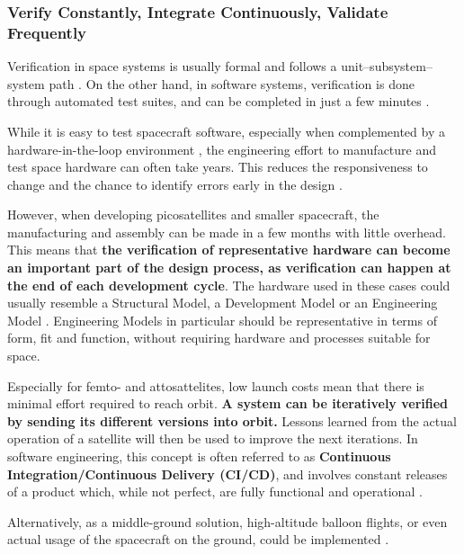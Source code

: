 \documentclass[]{iac}
\begin{document}

\subsubsection{Verify Constantly, Integrate Continuously, Validate Frequently} \label{sec:cicd}

Verification in space systems is usually formal and follows a unit--subsystem--system path \autocite{bundesrepublik_deutschland_v-modell_2006}. On the other hand, in software systems, verification is done through automated test suites, and can be completed in just a few minutes \autocite{beck_test_2002}.

While it is easy to test spacecraft software, especially when complemented by a hardware-in-the-loop environment \autocite{fritz_hardware---loop_2015}, the engineering effort to manufacture and test space hardware can often take years. This reduces the responsiveness to change and the chance to identify errors early in the design \autocite{garzaniti_effectiveness_2019,peterson_when_2021}.

However, when developing picosatellites and smaller spacecraft, the manufacturing and assembly can be made in a few months with little overhead. This means that \textbf{the verification of representative hardware can become an important part of the design process, as verification can happen at the end of each development cycle}. The hardware used in these cases could usually resemble a Structural Model, a Development Model or an Engineering Model \autocite{ECSS-E-HB-10-02A}. Engineering Models in particular should be representative in terms of form, fit and function, without requiring hardware and processes suitable for space.

Especially for femto- and attosattelites, low launch costs mean that there is minimal effort required to reach orbit. \textbf{A system can be iteratively verified by sending its different versions into orbit.} Lessons learned from the actual operation of a satellite will then be used to improve the next iterations. In software engineering, this concept is often referred to as \textbf{Continuous Integration/Continuous Delivery (CI/CD)}, and involves constant releases of a product which, while not perfect, are fully functional and operational \autocite{beck_extreme_2008,shahin_continuous_2017}.

Alternatively, as a middle-ground solution, high-altitude balloon flights, or even actual usage of the spacecraft on the ground, could be implemented \autocite{adams_theory_2020}.
\end{document}
